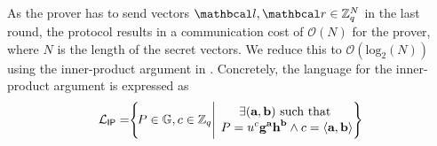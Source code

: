   
  
  
  
  As the prover has to send vectors $\lvec, \rvec \in \Z_q^N$ in the last round, the \proto protocol results in a communication cost of $\mathcal{O}(N)$ for the prover, where $N$ is the length of the secret vectors.
  We reduce this to $\mathcal{O}(\text{log}_2(N))$ using the inner-product argument in \cite{Bunz2018}. Concretely, the language for the inner-product argument is expressed as 
  \begin{equation}
    \L_{\textsf{IP}} = \hspace{-1mm}
    \left\{ 
    \hspace{-0.5mm}  
    P \in \G, c \in \Z_q \Bigg| 
    \text{
    \hspace{-3mm}
    \begin{tabular}{c}
    $\exists (\textbf{a}, \textbf{b}) \text{ such that }$
    \\ 
    $P = u^{c}\textbf{g}^{\textbf{a}} \textbf{h}^{\textbf{b}} \wedge c = \langle \textbf{a}, \textbf{b} \rangle$
    \end{tabular}
    \hspace{-3mm}
    }
    \hspace{-1.5mm}
    \right\}
    \label{eqnIPALanguage}
  \end{equation}
  
  
